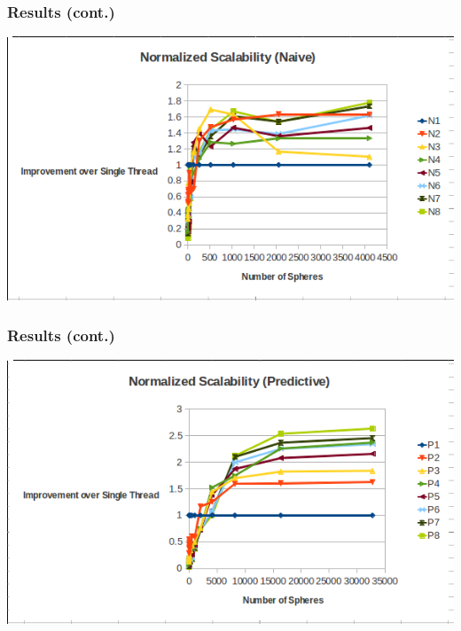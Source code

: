 \documentclass{beamer}
\begin{document}
\begin{frame}
	\frametitle{Results (cont.)}
	\begin{center}
		\includegraphics[width=.75\textwidth]{normalized_scalability_naive.png}
	\end{center}
\end{frame}

\begin{frame}
	\frametitle{Results (cont.)}
	\begin{center}
		\includegraphics[width=.75\textwidth]{normalized_scalability_predictive.png}
	\end{center}
\end{frame}






	
\end{document}
